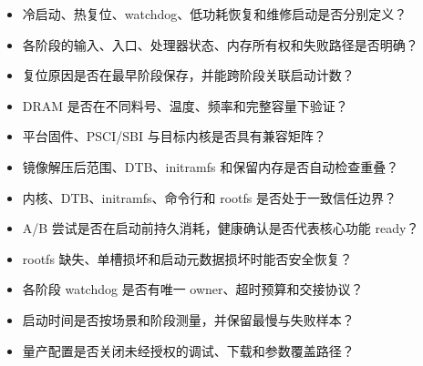 \begin{itemize}
  \item 冷启动、热复位、watchdog、低功耗恢复和维修启动是否分别定义？
  \item 各阶段的输入、入口、处理器状态、内存所有权和失败路径是否明确？
  \item 复位原因是否在最早阶段保存，并能跨阶段关联启动计数？
  \item DRAM 是否在不同料号、温度、频率和完整容量下验证？
  \item 平台固件、PSCI/SBI 与目标内核是否具有兼容矩阵？
  \item 镜像解压后范围、DTB、initramfs 和保留内存是否自动检查重叠？
  \item 内核、DTB、initramfs、命令行和 rootfs 是否处于一致信任边界？
  \item A/B 尝试是否在启动前持久消耗，健康确认是否代表核心功能 ready？
  \item rootfs 缺失、单槽损坏和启动元数据损坏时能否安全恢复？
  \item 各阶段 watchdog 是否有唯一 owner、超时预算和交接协议？
  \item 启动时间是否按场景和阶段测量，并保留最慢与失败样本？
  \item 量产配置是否关闭未经授权的调试、下载和参数覆盖路径？
\end{itemize}
